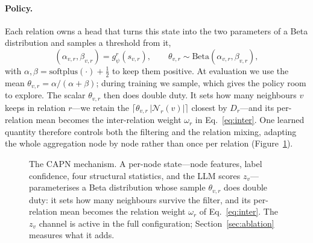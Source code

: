 \documentclass{conf}
\begin{document}
\paragraph{Policy.} Each relation owns a head that turns this state into the two
parameters of a Beta distribution and samples a threshold from it,
\begin{equation}
\label{eq:policy}
(\alpha_{v,r},\beta_{v,r}) = g^{r}_{\psi}(s_{v,r}),
\qquad
\theta_{v,r} \sim \mathrm{Beta}(\alpha_{v,r},\beta_{v,r}),
\end{equation}
with $\alpha,\beta=\mathrm{softplus}(\cdot)+\tfrac12$ to keep them positive. At
evaluation we use the mean $\theta_{v,r}=\alpha/(\alpha+\beta)$; during training
we sample, which gives the policy room to explore. The scalar $\theta_{v,r}$
then does double duty. It sets how many neighbours $v$ keeps in relation
$r$---we retain the $\lceil \theta_{v,r}\,|\mathcal{N}_r(v)|\rceil$ closest by
$D_r$---and its per-relation mean becomes the inter-relation weight $\omega_r$
in Eq.~\eqref{eq:inter}. One learned quantity therefore controls both the
filtering and the relation mixing, adapting the whole aggregation node by node
rather than once per relation (Figure~\ref{fig:capn}).

\begin{figure}[t]
\centering

\caption{The CAPN mechanism. A per-node state---node features, label
confidence, four structural statistics, and the LLM scores $z_v$---parameterises
a Beta distribution whose sample $\theta_{v,r}$ does double duty: it sets how
many neighbours survive the filter, and its per-relation mean becomes the
relation weight $\omega_r$ of Eq.~\eqref{eq:inter}. The $z_v$ channel is active
in the full configuration; Section~\ref{sec:ablation} measures what it adds.}
\label{fig:capn}
\end{figure}
\end{document}
